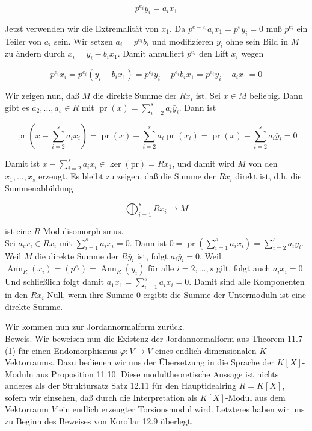 \documentclass[10pt, letterpaper]{article}
\begin{document}
$$
p^{e_{i}} y_{i}=a_{i} x_{1}
$$

Jetzt verwenden wir die Extremalität von $x_{1}$. Da $p^{e-e_{i}} a_{i} x_{1}=p^{e} y_{i}=0$ muß $p^{e_{i}}$ ein Teiler von $a_{i}$ sein. Wir setzen $a_{i}=p^{e_{i}} b_{i}$ und modifizieren $y_{i}$ ohne sein Bild in $\bar{M}$ zu ändern durch $x_{i}=y_{i}-b_{i} x_{1}$. Damit annulliert $p^{e_{i}}$ den Lift $x_{i}$ wegen

$$
p^{e_{i}} x_{i}=p^{e_{i}}\left(y_{i}-b_{i} x_{1}\right)=p^{e_{i}} y_{i}-p^{e_{i}} b_{i} x_{1}=p^{e_{i}} y_{i}-a_{i} x_{1}=0
$$

Wir zeigen nun, daß $M$ die direkte Summe der $R x_{i}$ ist. Sei $x \in M$ beliebig. Dann gibt es $a_{2}, \ldots, a_{s} \in R$ mit $\operatorname{pr}(x)=\sum_{i=2}^{s} a_{i} \bar{y}_{i}$. Dann ist

$$
\operatorname{pr}\left(x-\sum_{i=2}^{s} a_{i} x_{i}\right)=\operatorname{pr}(x)-\sum_{i=2}^{s} a_{i} \operatorname{pr}\left(x_{i}\right)=\operatorname{pr}(x)-\sum_{i=2}^{s} a_{i} \bar{y}_{i}=0
$$

Damit ist $x-\sum_{i=2}^{s} a_{i} x_{i} \in \operatorname{ker}(\mathrm{pr})=R x_{1}$, und damit wird $M$ von den $x_{1}, \ldots, x_{s}$ erzeugt. Es bleibt zu zeigen, daß die Summe der $R x_{i}$ direkt ist, d.h. die Summenabbildung

$$
\bigoplus_{i=1}^{s} R x_{i} \rightarrow M
$$

ist eine $R$-Modulisomorphismus.\\
Sei $a_{i} x_{i} \in R x_{i}$ mit $\sum_{i=1}^{s} a_{i} x_{i}=0$. Dann ist $0=\operatorname{pr}\left(\sum_{i=1}^{s} a_{i} x_{i}\right)=\sum_{i=2}^{s} a_{i} \bar{y}_{i}$. Weil $\bar{M}$ die direkte Summe der $R \bar{y}_{i}$ ist, folgt $a_{i} \bar{y}_{i}=0$. Weil $\operatorname{Ann}_{R}\left(x_{i}\right)=\left(p^{e_{i}}\right)=\operatorname{Ann}_{R}\left(\bar{y}_{i}\right)$ für alle $i=2, \ldots, s$ gilt, folgt auch $a_{i} x_{i}=0$. Und schließlich folgt damit $a_{1} x_{1}=\sum_{i=1}^{s} a_{i} x_{i}=0$. Damit sind alle Komponenten in den $R x_{i}$ Null, wenn ihre Summe 0 ergibt: die Summe der Untermoduln ist eine direkte Summe.

Wir kommen nun zur Jordannormalform zurück.\\
Beweis. Wir beweisen nun die Existenz der Jordannormalform aus Theorem 11.7 (1) für einen Endomorphismus $\varphi: V \rightarrow V$ eines endlich-dimensionalen $K$-Vektorraums. Dazu bedienen wir uns der Übersetzung in die Sprache der $K[X]$-Moduln aus Proposition 11.10. Diese modultheoretische Aussage ist nichts anderes als der Struktursatz Satz 12.11 für den Hauptidealring $R=K[X]$, sofern wir einsehen, daß durch die Interpretation als $K[X]$-Modul aus dem Vektorraum $V$ ein endlich erzeugter Torsionsmodul wird. Letzteres haben wir uns zu Beginn des Beweises von Korollar 12.9 überlegt.
\end{document}
